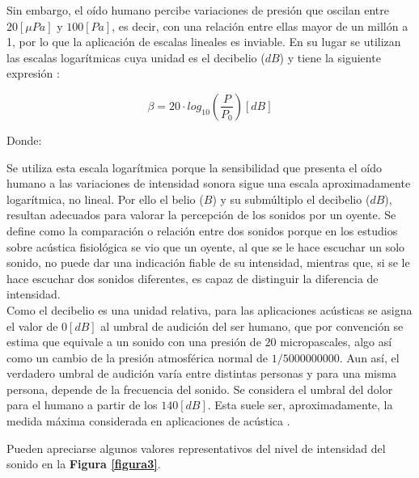 \documentclass[letter,11pt]{article}
\newcommand{\source}[1]{\vspace{-11pt} \caption*{\small{\textbf{Nota:} {#1}}}}
\begin{document}
Sin embargo, el oído humano percibe variaciones de presión que oscilan entre 
$20 [\mu Pa]$ y $100 [Pa]$, es decir, con una relación entre ellas mayor de un
millón a 1, por lo que la aplicación de escalas lineales es inviable. En su
lugar se utilizan las escalas logarítmicas cuya unidad es el decibelio ($dB$) y
tiene la siguiente expresión \cite{SUPERINTENDENCIA}:

\begin{equation*}
    \beta = 20\cdot log_{10}\left(\frac{P}{P_0}\right) [dB]
\end{equation*}
\vspace{0.10cm}

Donde:

Se utiliza esta escala logarítmica porque la sensibilidad que presenta el oído
humano a las variaciones de intensidad sonora sigue una escala aproximadamente
logarítmica, no lineal. Por ello el belio ($B$) y su submúltiplo el decibelio
($dB$), resultan adecuados para valorar la percepción de los sonidos por un
oyente. Se define como la comparación o relación entre dos sonidos porque en los
estudios sobre acústica fisiológica se vio que un oyente, al que se le hace
escuchar un solo sonido, no puede dar una indicación fiable de su intensidad,
mientras que, si se le hace escuchar dos sonidos diferentes, es capaz de
distinguir la diferencia de intensidad.
\\

Como el decibelio es una unidad relativa, para las aplicaciones acústicas se
asigna el valor de $0 [dB]$ al umbral de audición del ser humano, que por
convención se estima que equivale a un sonido con una presión de $20$
micropascales, algo así como un cambio de la presión atmosférica normal de
$1/5 000 000 000$. Aun así, el verdadero umbral de audición varía entre
distintas personas y para una misma persona, depende de la frecuencia del
sonido. Se considera el umbral del dolor para el humano a partir de los
$140 [dB]$. Esta suele ser, aproximadamente, la medida máxima considerada en
aplicaciones de acústica \cite{WIKI1}.

Pueden apreciarse algunos valores representativos del nivel de intensidad del
sonido en la \textbf{Figura \ref{figura3}}.

\end{document}
